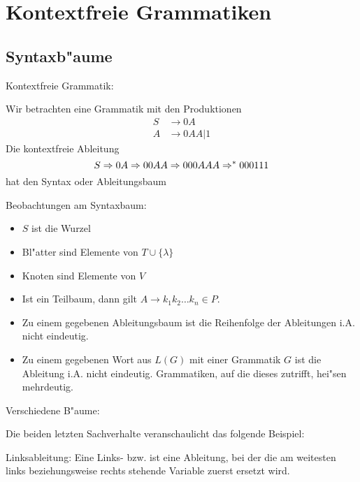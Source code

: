 \section{Kontextfreie Grammatiken}
\subsection{Syntaxb"aume}
\example Kontextfreie Grammatik:{
  Wir betrachten eine Grammatik mit den Produktionen
  \begin{align*}
    S &\to 0A\\
    A &\to 0AA | 1
    \end{align*}
  Die kontextfreie Ableitung
  \[S\Rightarrow 0A\Rightarrow 00AA\Rightarrow 000AAA\Rightarrow^* 000111
    \]
  hat den Syntax oder Ableitungsbaum
  
  }
\remark Beobachtungen am Syntaxbaum:{
  \begin{itemize}
    \item $S$ ist die Wurzel
    \item Bl"atter sind Elemente von $T \cup \{\lambda\}$
    \item Knoten sind Elemente von $V$
    \item Ist 
      ein Teilbaum, dann gilt $A \to k_1 k_2 \ldots k_n \in P$.
    \item Zu einem gegebenen Ableitungsbaum ist die Reihenfolge der
      Ableitungen i.A. nicht eindeutig.
    \item Zu einem gegebenen Wort aus $L(G)$ mit einer Grammatik $G$ ist 
      die Ableitung i.A. nicht eindeutig. Grammatiken, auf die dieses zutrifft,
      hei"sen mehrdeutig. 
    \end{itemize}
  }
\example Verschiedene B"aume:{
  Die beiden letzten Sachverhalte veranschaulicht das folgende Beispiel:
  
  }
 Linksableitung:{
  Eine Links- bzw.  ist eine
  Ableitung, bei der die am weitesten links beziehungsweise rechts
  stehende Variable zuerst ersetzt wird.
  }
